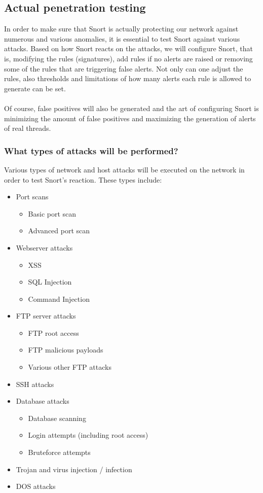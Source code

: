 \subsection{Actual penetration testing}

In order to make sure that Snort is actually protecting our network against numerous and various anomalies, it is essential to test Snort against various attacks. Based on how Snort reacts on the attacks, we will configure Snort, that is, modifying the rules (signatures), add rules if no alerts are raised or removing some of the rules that are triggering false alerts. Not only can one adjust the rules, also thresholds and limitations of how many alerts each rule is allowed to generate can be set. \\ \\
Of course, false positives will also be generated and the art of configuring Snort is minimizing the amount of false positives and maximizing the generation of alerts of real threads.

\subsubsection{What types of attacks will be performed?}

Various types of network and host attacks will be executed on the network in order to test Snort's reaction. These types include:
\begin{itemize}
\item Port scans
	\begin{itemize}
	\item Basic port scan
	\item Advanced port scan
	\end{itemize}
\item Webserver attacks
	\begin{itemize}
	\item XSS
	\item SQL Injection
	\item Command Injection
	\end{itemize}
\item FTP server attacks
	\begin{itemize}
	\item FTP root access
	\item FTP malicious payloads
	\item Various other FTP attacks
	\end{itemize}
\item SSH attacks
\item Database attacks
	\begin{itemize}
	\item Database scanning
	\item Login attempts (including root access)
	\item Bruteforce attempts
	\end{itemize}
\item Trojan and virus injection / infection
\item DOS attacks
\end{itemize}

